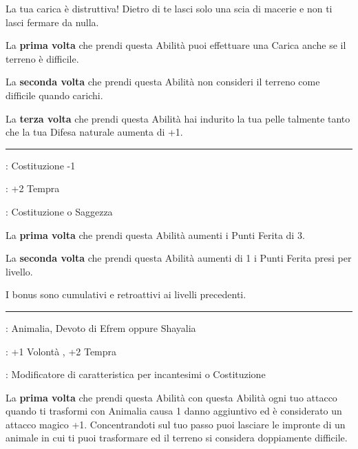 \begin{multicols}{2}
La tua carica è distruttiva! Dietro di te lasci solo una scia di macerie e non ti lasci fermare da nulla.

La \textbf{prima volta} che prendi questa Abilità puoi effettuare una Carica anche se il terreno è difficile.

La \textbf{seconda volta} che prendi questa Abilità non consideri il terreno come difficile quando carichi.

La \textbf{terza volta} che prendi questa Abilità hai indurito la tua pelle talmente tanto che la tua Difesa naturale aumenta di +1.

\smallskip\noindent\rule{\linewidth}{2pt} \hypertarget{Robusto}{}\medskip{}
\noindent
\begin{description}[noitemsep, topsep=0pt, parsep=0pt, partopsep=0pt, leftmargin=0cm, labelwidth=2.5cm]
    \item[\textbf{Requisito}]: Costituzione -1
    \item[\textbf{Tiri Salvezza}]: +2 Tempra
    \item[\textbf{Caratteristica}]: Costituzione o Saggezza
\end{description}

La \textbf{prima volta} che prendi questa Abilità aumenti i Punti Ferita di 3.

La \textbf{seconda volta} che prendi questa Abilità aumenti di 1 i Punti Ferita presi per livello.

I bonus sono cumulativi e retroattivi ai livelli precedenti.

\smallskip\noindent\rule{\linewidth}{2pt} \hypertarget{Sangue Puro}{}\medskip{}
\noindent
\begin{description}[noitemsep, topsep=0pt, parsep=0pt, partopsep=0pt, leftmargin=0cm, labelwidth=2.5cm]
    \item[\textbf{Requisito}]: Animalia, Devoto di Efrem oppure Shayalia
    \item[\textbf{Tiri Salvezza}]: +1 Volontà , +2 Tempra
    \item[\textbf{Caratteristica}]: Modificatore di caratteristica per incantesimi o Costituzione
\end{description}

La \textbf{prima volta} che prendi questa Abilità con questa Abilità ogni tuo attacco quando ti trasformi con Animalia causa 1 danno aggiuntivo ed è considerato un attacco magico +1. Concentrandoti sul tuo passo puoi lasciare le impronte di un animale in cui ti puoi trasformare ed il terreno si considera doppiamente difficile.


\end{multicols}
